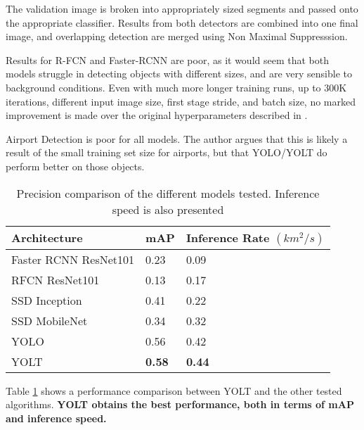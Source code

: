 The validation image is broken into appropriately sized segments and passed onto the appropriate classifier. Results from both detectors are combined into one final image, and overlapping detection are merged using Non Maximal Suppresssion.

Results for R-FCN and Faster-RCNN are poor, as it would seem that both models struggle in detecting objects with different sizes, and are very sensible to background conditions. Even with much more longer training runs, up to 300K iterations, different input image size, first stage stride, and batch size, no marked improvement is made over the original hyperparameters described in \cite{huangAlObjDetectors}.

Airport Detection is poor for all models. The author argues that this is likely a result of the small training set size for airports, but that YOLO/YOLT do perform better on those objects.

\begin{table}[h!]
\centering
\begin{tabular}{lll}
	\toprule
	Architecture          & mAP           & Inference Rate $(km^2/s)$ \\\midrule
Faster RCNN ResNet101 & 0.23          & 0.09                    \\
RFCN ResNet101        & 0.13          & 0.17                    \\
SSD Inception         & 0.41          & 0.22                    \\
SSD MobileNet         & 0.34          & 0.32                    \\
YOLO                  & 0.56          & 0.42                    \\
YOLT                  & \textbf{0.58} & \textbf{0.44}          \\\bottomrule
\end{tabular}
	\caption[Precision comparison of YOLT versus traditional detection pipelines]{Precision comparison of the different models tested. Inference speed is also presented}
\label{tab:SIMRDWNPerf}
\end{table}

Table \ref{tab:SIMRDWNPerf} shows a performance comparison between YOLT and the other tested algorithms. \textbf{YOLT obtains the best performance, both in terms of mAP and inference speed.}

